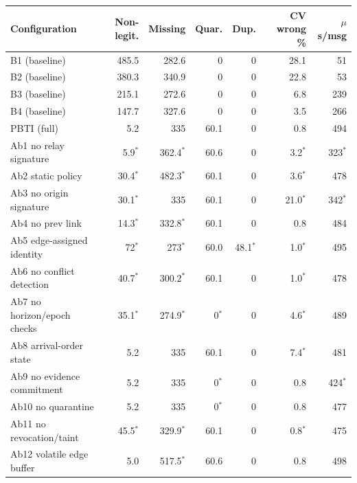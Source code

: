 \begin{tabular}{lrrrrrr}
\toprule
\textbf{Configuration} & \textbf{Non-legit.} & \textbf{Missing} & \textbf{Quar.} & \textbf{Dup.} & \textbf{CV wrong \%} & \textbf{$\mu$s/msg}\\
\midrule
B1 (baseline) & 485.5 & 282.6 & 0 & 0 & 28.1 & 51\\
B2 (baseline) & 380.3 & 340.9 & 0 & 0 & 22.8 & 53\\
B3 (baseline) & 215.1 & 272.6 & 0 & 0 & 6.8 & 239\\
B4 (baseline) & 147.7 & 327.6 & 0 & 0 & 3.5 & 266\\
\midrule
PBTI (full) & 5.2 & 335 & 60.1 & 0 & 0.8 & 494\\
Ab1 no relay signature & 5.9$^{*}$ & 362.4$^{*}$ & 60.6 & 0 & 3.2$^{*}$ & 323$^{*}$\\
Ab2 static policy & 30.4$^{*}$ & 482.3$^{*}$ & 60.1 & 0 & 3.6$^{*}$ & 478\\
Ab3 no origin signature & 30.1$^{*}$ & 335 & 60.1 & 0 & 21.0$^{*}$ & 342$^{*}$\\
Ab4 no prev link & 14.3$^{*}$ & 332.8$^{*}$ & 60.1 & 0 & 0.8 & 484\\
Ab5 edge-assigned identity & 72$^{*}$ & 273$^{*}$ & 60.0 & 48.1$^{*}$ & 1.0$^{*}$ & 495\\
Ab6 no conflict detection & 40.7$^{*}$ & 300.2$^{*}$ & 60.1 & 0 & 1.0$^{*}$ & 478\\
Ab7 no horizon/epoch checks & 35.1$^{*}$ & 274.9$^{*}$ & 0$^{*}$ & 0 & 4.6$^{*}$ & 489\\
Ab8 arrival-order state & 5.2 & 335 & 60.1 & 0 & 7.4$^{*}$ & 481\\
Ab9 no evidence commitment & 5.2 & 335 & 0$^{*}$ & 0 & 0.8 & 424$^{*}$\\
Ab10 no quarantine & 5.2 & 335 & 0$^{*}$ & 0 & 0.8 & 477\\
Ab11 no revocation/taint & 45.5$^{*}$ & 329.9$^{*}$ & 60.1 & 0 & 0.8$^{*}$ & 475\\
Ab12 volatile edge buffer & 5.0 & 517.5$^{*}$ & 60.6 & 0 & 0.8 & 498\\
\bottomrule
\end{tabular}
